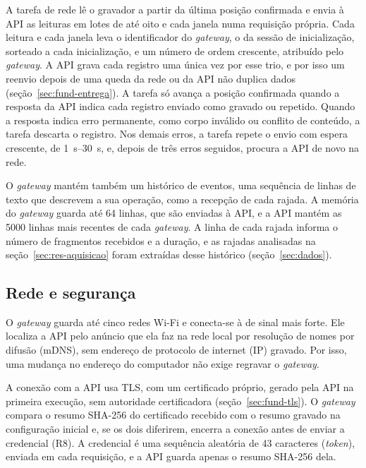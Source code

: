 A tarefa de rede lê o gravador a partir da última posição confirmada e envia à API as leituras em lotes de até oito e cada janela numa requisição própria. Cada leitura e cada janela leva o identificador do \textit{gateway}, o da sessão de inicialização, sorteado a cada inicialização, e um número de ordem crescente, atribuído pelo \textit{gateway}. A API grava cada registro uma única vez por esse trio, e por isso um reenvio depois de uma queda da rede ou da API não duplica dados (seção~\ref{sec:fund-entrega}). A tarefa só avança a posição confirmada quando a resposta da API indica cada registro enviado como gravado ou repetido. Quando a resposta indica erro permanente, como corpo inválido ou conflito de conteúdo, a tarefa descarta o registro. Nos demais erros, a tarefa repete o envio com espera crescente, de \SIrange{1}{30}{\second}, e, depois de três erros seguidos, procura a API de novo na rede.

O \textit{gateway} mantém também um histórico de eventos, uma sequência de linhas de texto que descrevem a sua operação, como a recepção de cada rajada. A memória do \textit{gateway} guarda até \num{64} linhas, que são enviadas à API, e a API mantém as \num{5000} linhas mais recentes de cada \textit{gateway}. A linha de cada rajada informa o número de fragmentos recebidos e a duração, e as rajadas analisadas na seção~\ref{sec:res-aquisicao} foram extraídas desse histórico (seção~\ref{sec:dados}).

\subsection{Rede e segurança}

O \textit{gateway} guarda até cinco redes Wi-Fi e conecta-se à de sinal mais forte. Ele localiza a API pelo anúncio que ela faz na rede local por resolução de nomes por difusão (mDNS), sem endereço de protocolo de internet (IP) gravado. Por isso, uma mudança no endereço do computador não exige regravar o \textit{gateway}.

A conexão com a API usa TLS, com um certificado próprio, gerado pela API na primeira execução, sem autoridade certificadora (seção~\ref{sec:fund-tls}). O \textit{gateway} compara o resumo SHA-256 do certificado recebido com o resumo gravado na configuração inicial e, se os dois diferirem, encerra a conexão antes de enviar a credencial (R8). A credencial é uma sequência aleatória de \num{43} caracteres (\textit{token}), enviada em cada requisição, e a API guarda apenas o resumo SHA-256 dela.


